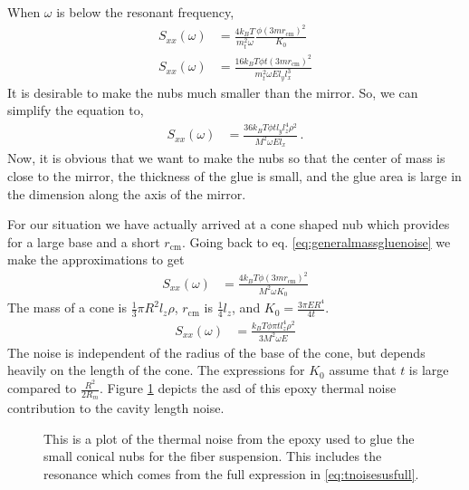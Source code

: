 When $\omega$ is below the resonant frequency,
\begin{align}
S_{xx}(\omega) &= \frac{4k_BT}{m_t^2 \omega}
  \frac{\phi(3mr_{\mathrm{cm}})^2}{K_0} \label{eq:generalmassgluenoise} \\
S_{xx}(\omega) &= \frac{16k_BT\phi t(3mr_{\mathrm{cm}})^2}{m_t^2 \omega El_yl_x^3}
\end{align}
It is desirable to make the nubs much smaller than the mirror.
So, we can simplify the equation to,
\begin{align}
S_{xx}(\omega) &= \frac{36k_BT\phi t l_yl_z^4\rho^2}{M^2\omega El_x} \,.
\end{align}
Now, it is obvious that we want to make the nubs so that the center of mass is
close to the mirror, the thickness of the glue is small, and the glue area is
large in the dimension along the axis of the mirror.

For our situation we have actually arrived at a cone shaped nub which provides
for a large base and a short $r_{\mathrm{cm}}$. Going back to eq.
\eqref{eq:generalmassgluenoise} we make the approximations to get
\begin{align}
S_{xx}(\omega) &= \frac{4k_BT\phi(3mr_{\mathrm{cm}})^2}{M^2 \omega K_0}
\end{align}
The mass of a cone is $\frac{1}{3} \pi R^2 l_z \rho$, $r_{\mathrm{cm}}$ is
$\frac{1}{4} l_z$, and $K_0 = \frac{3\pi ER^4}{4t}$.
\begin{align}
S_{xx}(\omega) &= \frac{k_BT\phi \pi t l_z^4\rho^2}{3M^2 \omega E}
\end{align}
The noise is independent of the radius of the base of the cone, but depends
heavily on the length of the cone. The expressions for $K_0$ assume that
$t$ is large compared to $\frac{R^2}{2R_m}$. Figure \ref{fig:tnoisec}
depicts the \ac{asd} of this epoxy thermal noise contribution to the cavity
length noise.

\begin{figure}
  \caption[Epoxy Thermal Noise Contribution to Trap Length]{This is a plot
    of the thermal noise from the epoxy used to glue the small conical nubs
    for the fiber suspension. This includes the resonance which comes from
    the full expression in \eqref{eq:tnoisesusfull}.}
  \label{fig:tnoisec}
\end{figure}

